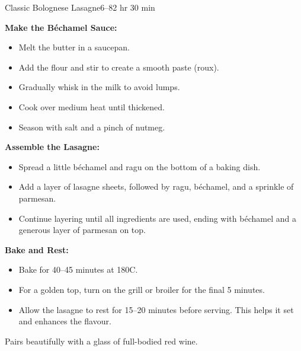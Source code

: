 \begin{recipebox}{Classic Bolognese Lasagne}{6--8}{2 hr 30 min}
\begin{method}
    \vspace{0.3em}
    \item \textbf{Make the Béchamel Sauce:}
    \begin{itemize}[leftmargin=2em]
      \item Melt the butter in a saucepan.
      \item Add the flour and stir to create a smooth paste (roux).
      \item Gradually whisk in the milk to avoid lumps.
      \item Cook over medium heat until thickened.
      \item Season with salt and a pinch of nutmeg.
    \end{itemize}

    \vspace{0.3em}
    \item \textbf{Assemble the Lasagne:}
    \begin{itemize}[leftmargin=2em]
      \item Spread a little béchamel and ragu on the bottom of a baking dish.
      \item Add a layer of lasagne sheets, followed by ragu, béchamel, and a sprinkle of parmesan.
      \item Continue layering until all ingredients are used, ending with béchamel and a generous layer of parmesan on top.
    \end{itemize}

    \vspace{0.3em}
    \item \textbf{Bake and Rest:}
    \begin{itemize}[leftmargin=2em]
      \item Bake for 40--45 minutes at 180\degree C.
      \item For a golden top, turn on the grill or broiler for the final 5 minutes.
      \item Allow the lasagne to rest for 15--20 minutes before serving. This helps it set and enhances the flavour.
    \end{itemize}

  \end{method}

  \begin{notes}
    Pairs beautifully with a glass of full-bodied red wine.
  \end{notes}

\end{recipebox}